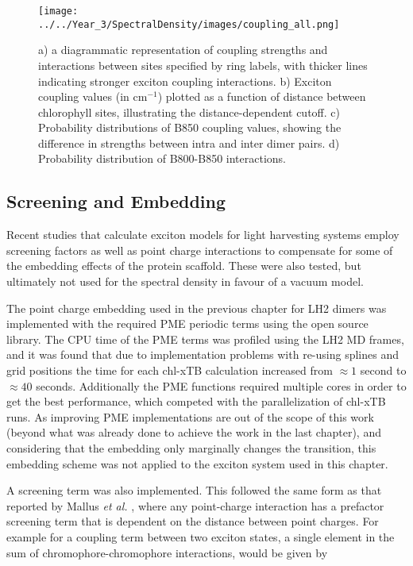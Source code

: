 \begin{figure}
    \centering
    \texttt{[image: ../../Year\_3/SpectralDensity/images/coupling\_all.png]}
    \caption{a) a diagrammatic representation of coupling strengths and interactions
    between sites specified by ring labels, with thicker lines indicating stronger
    exciton coupling interactions. b) Exciton coupling values (in $\text{cm}^{-1}$)
    plotted as a function of distance between chlorophyll sites, illustrating the
    distance-dependent cutoff. c) Probability distributions of B850 coupling values,
    showing the difference in strengths between intra and inter dimer pairs. d) 
    Probability distribution of B800-B850 interactions.}
    \label{fig:coupling_all}
\end{figure}

\subsection{Screening and Embedding}
\label{subsec:screening}

Recent studies that calculate exciton models for light harvesting systems employ
screening factors as well as point charge interactions to compensate for some of
the embedding effects of the protein scaffold. These were also tested, but ultimately
not used for the spectral density in favour of a vacuum model.

The point charge embedding used in the previous chapter for LH2 dimers was implemented 
with the required PME periodic terms using the open source  library.
The CPU time of the PME terms was profiled using the LH2 MD frames, and it was found
that due to implementation problems with re-using splines and grid positions the
time for each chl-xTB calculation increased from $\approx 1$ second to $\approx 40$
seconds. Additionally the PME functions required multiple cores in order to get
the best performance, which competed with the parallelization of chl-xTB runs. As
improving PME implementations are out of the scope of this work (beyond what was 
already done to achieve the work in the last chapter), and considering that the
embedding only marginally changes the \Qy transition, this embedding scheme was
not applied to the exciton system used in this chapter.

A screening term was also implemented. This followed the same form as that reported
by Mallus \emph{et al.} \cite{Mallus2018}, where any point-charge interaction has
a prefactor screening term that is dependent on the distance between point charges.
For example for a coupling term between two exciton states, a single element in 
the sum of chromophore-chromophore interactions, would be given by

